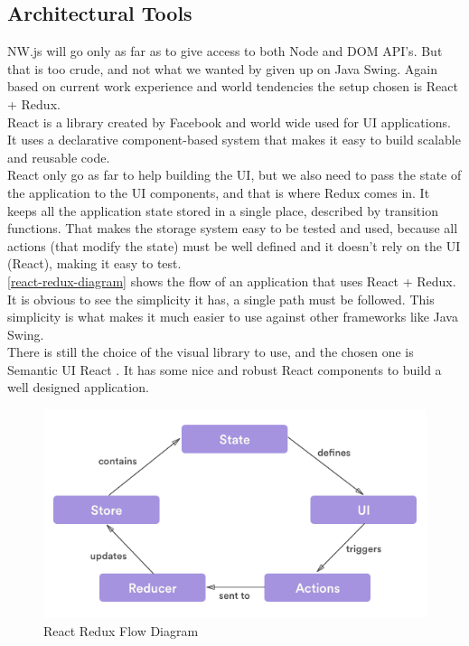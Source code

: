 \subsection{Architectural Tools}
NW.js will go only as far as to give access to both Node and DOM API's. But that
is too crude, and not what we wanted by given up on Java Swing. Again based on
current work experience and world tendencies the setup chosen is React + Redux. \\
React \cite{React} is a library created by Facebook and world wide used for UI applications.
It uses a declarative component-based system that makes it easy to build scalable
and reusable code.\\
React only go as far to help building the UI, but we also need to pass the state
of the application to the UI components, and that is where Redux \cite{Redux} comes in.
It keeps all the application state stored in a single place, described by transition
functions. That makes the storage system easy to be tested and used, because all
actions (that modify the state) must be well defined and it doesn't rely on the
UI (React), making it easy to test.\\
\autoref{react-redux-diagram} shows the flow of an application that uses
React + Redux. It is obvious to see the simplicity it has, a single path must be followed.
This simplicity is what makes it much easier to use against other frameworks like
Java Swing. \\
There is still the choice of the visual library to use, and the chosen one is
Semantic UI React \cite{semantic-ui}. It has some nice and robust React components
to build a well designed application.

\begin{figure}[htb]
  \centering
  \caption{React Redux Flow Diagram}
  \label{react-redux-diagram}
  \includegraphics[scale=0.5]{images/react-redux-diagram.png}
\end{figure}

